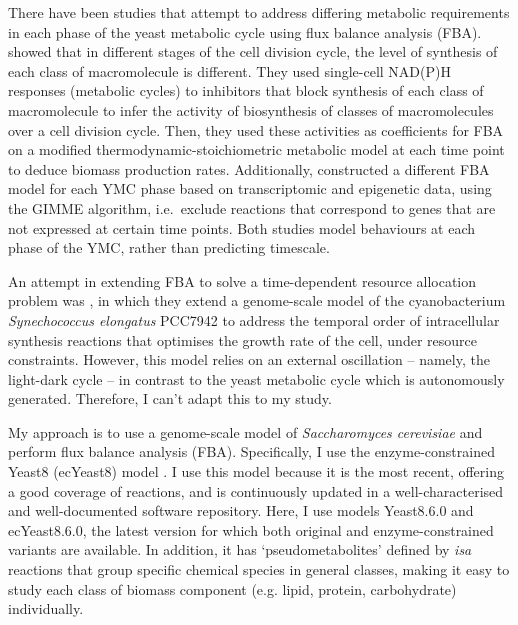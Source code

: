 There have been studies that attempt to address differing metabolic requirements in each phase of the yeast metabolic cycle using flux balance analysis (FBA).
\textcite{takhaveevTemporalSegregationBiosynthetic2023} showed that in different stages of the cell division cycle, the level of synthesis of each class of macromolecule is different.
They used single-cell NAD(P)H responses (metabolic cycles) to inhibitors that block synthesis of each class of macromolecule to infer the activity of biosynthesis of classes of macromolecules over a cell division cycle.
Then, they used these activities as coefficients for FBA on a modified thermodynamic-stoichiometric metabolic model at each time point to deduce biomass production rates.
Additionally, \textcite{cesurGenomeWideAnalysisYeast} constructed a different FBA model for each YMC phase based on transcriptomic and epigenetic data, using the GIMME algorithm, i.e.\ exclude reactions that correspond to genes that are not expressed at certain time points.
Both studies model behaviours at each phase of the YMC, rather than predicting timescale.

An attempt in extending FBA to solve a time-dependent resource allocation problem was \textcite{reimersCellularTradeoffsOptimal2017}, in which they extend a genome-scale model of the cyanobacterium \emph{Synechococcus elongatus} PCC7942 to address the temporal order of intracellular synthesis reactions that optimises the growth rate of the cell, under resource constraints.
However, this model relies on an external oscillation -- namely, the light-dark cycle -- in contrast to the yeast metabolic cycle which is autonomously generated.
Therefore, I can't adapt this to my study.

My approach is to use a genome-scale model of \emph{Saccharomyces cerevisiae} and perform flux balance analysis (FBA).
Specifically, I use the enzyme-constrained Yeast8 (ecYeast8) model \parencite{luConsensusCerevisiaeMetabolic2019}.
I use this model because it is the most recent, offering a good coverage of reactions, and is continuously updated in a well-characterised and well-documented software repository.
Here, I use models Yeast8.6.0 and ecYeast8.6.0, the latest version for which both original and enzyme-constrained variants are available.
In addition, it has `pseudometabolites' defined by \emph{isa} reactions \parencite{heavnerYeastExpandedReconstruction2012} that group specific chemical species in general classes, making it easy to study each class of biomass component (e.g. lipid, protein, carbohydrate) individually.

